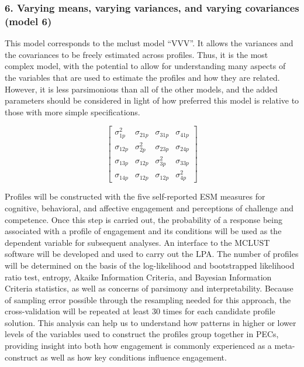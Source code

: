 \documentclass[]{msu-thesis}
\theoremstyle{definition}
\theoremstyle{definition}
\theoremstyle{definition}
\theoremstyle{remark}
\begin{document}
\subsubsection{6. Varying means, varying variances, and varying
covariances (model
6)}\label{varying-means-varying-variances-and-varying-covariances-model-6}

This model corresponds to the mclust model ``VVV''. It allows the
variances and the covariances to be freely estimated across profiles.
Thus, it is the most complex model, with the potential to allow for
understanding many aspects of the variables that are used to estimate
the profiles and how they are related. However, it is less parsimonious
than all of the other models, and the added parameters should be
considered in light of how preferred this model is relative to those
with more simple specifications.

\[
\left[ \begin{matrix} { \sigma  }_{ 1p }^{ 2 } & { \sigma  }_{ 21p } & { \sigma  }_{ 31p } & { \sigma  }_{ 41p } \\ { \sigma  }_{ 12p } & { \sigma  }_{ 2p }^{ 2 } & { \sigma  }_{ 23p } & { \sigma  }_{ 24p } \\ { \sigma  }_{ 13p } & { \sigma  }_{ 12p } & { \sigma  }_{ 3p }^{ 2 } & { \sigma  }_{ 33p } \\ { \sigma  }_{ 14p } & { \sigma  }_{ 12p } & { \sigma  }_{ 12p } & { \sigma  }_{ 4p }^{ 2 } \end{matrix} \right] 
\]

Profiles will be constructed with the five self-reported ESM measures
for cognitive, behavioral, and affective engagement and perceptions of
challenge and competence. Once this step is carried out, the probability
of a response being associated with a profile of engagement and its
conditions will be used as the dependent variable for subsequent
analyses. An interface to the MCLUST software will be developed and used
to carry out the LPA. The number of profiles will be determined on the
basis of the log-likelihood and bootstrapped likelihood ratio test,
entropy, Akaike Information Criteria, and Bayesian Information Criteria
statistics, as well as concerns of parsimony and interpretability.
Because of sampling error possible through the resampling needed for
this approach, the cross-validation will be repeated at least 30 times
for each candidate profile solution. This analysis can help us to
understand how patterns in higher or lower levels of the variables used
to construct the profiles group together in PECs, providing insight into
both how engagement is commonly experienced as a meta-construct as well
as how key conditions influence engagement.
\end{document}
